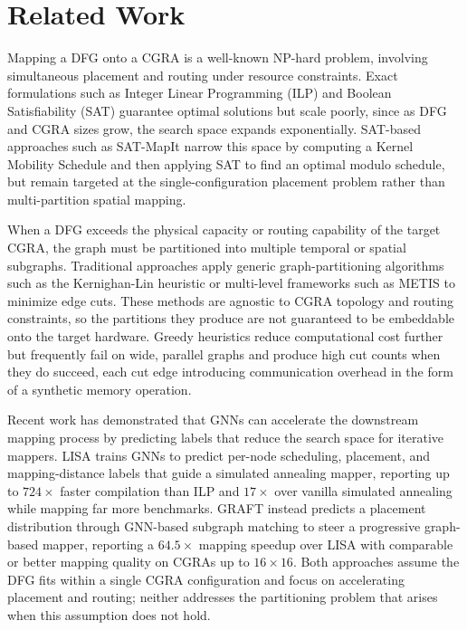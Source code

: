 \documentclass[runningheads]{llncs}
\begin{document}
\section{Related Work}
%


Mapping a DFG onto a CGRA is a well-known NP-hard problem, involving simultaneous placement and routing under resource constraints. Exact formulations such as Integer Linear Programming (ILP) and Boolean Satisfiability (SAT) guarantee optimal solutions but scale poorly, since as DFG and CGRA sizes grow, the search space expands exponentially. SAT-based approaches such as SAT-MapIt \cite{tirelli2023sat} narrow this space by computing a Kernel Mobility Schedule and then applying SAT to find an optimal modulo schedule, but remain targeted at the single-configuration placement problem rather than multi-partition spatial mapping. 

When a DFG exceeds the physical capacity or routing capability of the target CGRA, the graph must be partitioned into multiple temporal or spatial subgraphs. Traditional approaches apply generic graph-partitioning algorithms such as the Kernighan-Lin heuristic or multi-level frameworks such as METIS \cite{karypis1998metis} to minimize edge cuts. These methods are agnostic to CGRA topology and routing constraints, so the partitions they produce are not guaranteed to be embeddable onto the target hardware. Greedy heuristics reduce computational cost further but frequently fail on wide, parallel graphs and produce high cut counts when they do succeed, each cut edge introducing communication overhead in the form of a synthetic memory operation.

Recent work has demonstrated that GNNs can accelerate the downstream mapping process by predicting labels that reduce the search space for iterative mappers. LISA \cite{9773209} trains GNNs to predict per-node scheduling, placement, and mapping-distance labels that guide a simulated annealing mapper, reporting up to $724\times$ faster compilation than ILP and $17\times$ over vanilla simulated annealing while mapping far more benchmarks. GRAFT \cite{10416096} instead predicts a placement distribution through GNN-based subgraph matching to steer a progressive graph-based mapper, reporting a $64.5\times$ mapping speedup over LISA with comparable or better mapping quality on CGRAs up to $16\times16$. Both approaches assume the DFG fits within a single CGRA configuration and focus on accelerating placement and routing; neither addresses the partitioning problem that arises when this assumption does not hold.
\end{document}
